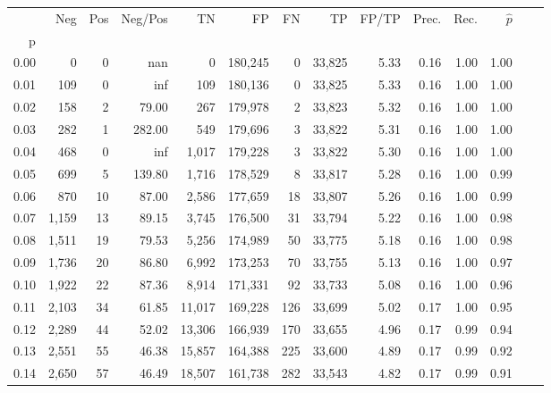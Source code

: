 \begin{tabular}{rrrrrrrrrrrrrr}
\toprule
{} &    Neg &  Pos & Neg/Pos &       TN &       FP &      FN &      TP & FP/TP & Prec. &  Rec. & $\hat{p}$ \\
p    &        &      &         &          &          &         &         &       &       &       &           \\
\midrule
0.00 &      0 &    0 &     nan &        0 &  180,245 &       0 &  33,825 &  5.33 &  0.16 &  1.00 &      1.00 \\
0.01 &    109 &    0 &     inf &      109 &  180,136 &       0 &  33,825 &  5.33 &  0.16 &  1.00 &      1.00 \\
0.02 &    158 &    2 &   79.00 &      267 &  179,978 &       2 &  33,823 &  5.32 &  0.16 &  1.00 &      1.00 \\
0.03 &    282 &    1 &  282.00 &      549 &  179,696 &       3 &  33,822 &  5.31 &  0.16 &  1.00 &      1.00 \\
0.04 &    468 &    0 &     inf &    1,017 &  179,228 &       3 &  33,822 &  5.30 &  0.16 &  1.00 &      1.00 \\
0.05 &    699 &    5 &  139.80 &    1,716 &  178,529 &       8 &  33,817 &  5.28 &  0.16 &  1.00 &      0.99 \\
0.06 &    870 &   10 &   87.00 &    2,586 &  177,659 &      18 &  33,807 &  5.26 &  0.16 &  1.00 &      0.99 \\
0.07 &  1,159 &   13 &   89.15 &    3,745 &  176,500 &      31 &  33,794 &  5.22 &  0.16 &  1.00 &      0.98 \\
0.08 &  1,511 &   19 &   79.53 &    5,256 &  174,989 &      50 &  33,775 &  5.18 &  0.16 &  1.00 &      0.98 \\
0.09 &  1,736 &   20 &   86.80 &    6,992 &  173,253 &      70 &  33,755 &  5.13 &  0.16 &  1.00 &      0.97 \\
0.10 &  1,922 &   22 &   87.36 &    8,914 &  171,331 &      92 &  33,733 &  5.08 &  0.16 &  1.00 &      0.96 \\
0.11 &  2,103 &   34 &   61.85 &   11,017 &  169,228 &     126 &  33,699 &  5.02 &  0.17 &  1.00 &      0.95 \\
0.12 &  2,289 &   44 &   52.02 &   13,306 &  166,939 &     170 &  33,655 &  4.96 &  0.17 &  0.99 &      0.94 \\
0.13 &  2,551 &   55 &   46.38 &   15,857 &  164,388 &     225 &  33,600 &  4.89 &  0.17 &  0.99 &      0.92 \\
0.14 &  2,650 &   57 &   46.49 &   18,507 &  161,738 &     282 &  33,543 &  4.82 &  0.17 &  0.99 &      0.91 \\

\end{tabular}
